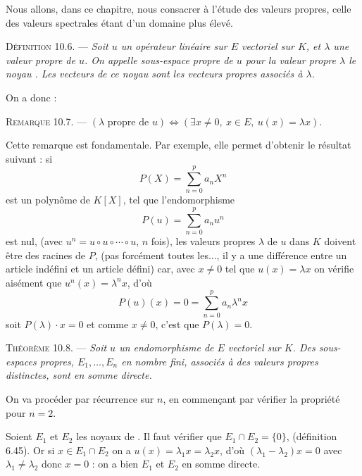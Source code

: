 Nous allons, dans ce chapitre, nous consacrer à l'étude des valeurs propres, celle des valeurs spectrales étant d'un domaine plus élevé.

\medskip\noindent\textsc{Définition 10.6.} --- \emph{Soit $u$ un opérateur linéaire sur $E$ vectoriel sur $K$, et $\lambda$ une valeur propre de $u$. On appelle sous-espace propre de $u$ pour la valeur propre $\lambda$ le noyau . Les vecteurs de ce noyau sont les vecteurs propres associés à $\lambda$.}

On a donc :

\medskip\noindent\textsc{Remarque 10.7.} --- $(\lambda\text{ propre de }u)\Longleftrightarrow(\exists x\ne0,\ x\in E,\ u(x)=\lambda x)$.

Cette remarque est fondamentale. Par exemple, elle permet d'obtenir le résultat suivant : si
\[
P(X)=\sum_{n=0}^p a_nX^n
\]
est un polynôme de $K[X]$, tel que l'endomorphisme
\[
P(u)=\sum_{n=0}^p a_nu^n
\]
est nul, (avec $u^n=u\circ u\circ\cdots\circ u$, $n$ fois), les valeurs propres $\lambda$ de $u$ dans $K$ doivent être des racines de $P$, (pas forcément toutes les..., il y a une différence entre un article indéfini et un article défini) car, avec $x\ne0$ tel que $u(x)=\lambda x$ on vérifie aisément que $u^n(x)=\lambda^nx$, d'où
\[
P(u)(x)=0=\sum_{n=0}^pa_n\lambda^nx
\]
soit $P(\lambda)\cdot x=0$ et comme $x\ne0$, c'est que $P(\lambda)=0$.

\medskip\noindent\textsc{Théorème 10.8.} --- \emph{Soit $u$ un endomorphisme de $E$ vectoriel sur $K$. Des sous-espaces propres, $E_1,\ldots,E_n$ en nombre fini, associés à des valeurs propres distinctes, sont en somme directe.}

On va procéder par récurrence sur $n$, en commençant par vérifier la propriété pour $n=2$.

Soient $E_1$ et $E_2$ les noyaux de . Il faut vérifier que $E_1\cap E_2=\{0\}$, (définition 6.45). Or si $x\in E_1\cap E_2$ on a $u(x)=\lambda_1x=\lambda_2x$, d'où $(\lambda_1-\lambda_2)x=0$ avec $\lambda_1\ne\lambda_2$ donc $x=0$ : on a bien $E_1$ et $E_2$ en somme directe.

